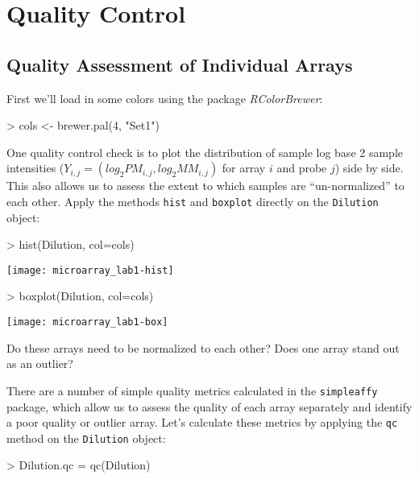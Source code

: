 \documentclass[12pt]{article}
\newcommand{\code}[1]{{\texttt{#1}}}
\begin{document}
\section{Quality Control}

\subsection{Quality Assessment of Individual Arrays}
 
First we'll load in some colors using the package {\it RColorBrewer}:
  
\begin{Schunk}
\begin{Sinput}
> cols <- brewer.pal(4, "Set1")
\end{Sinput}
\end{Schunk}
 
One quality control check is to plot the distribution of sample log base 2 sample intensities ($Y_{i,j} = (log_2PM_{i,j},log_2MM_{i,j})$ for array $i$ and probe $j$) side by side.  This also allows us to assess the extent to which samples are ``un-normalized'' to each other.  Apply the methods \code{hist} and \code{boxplot} directly on the \code{Dilution} object:
 
\begin{Schunk}
\begin{Sinput}
> hist(Dilution, col=cols)
\end{Sinput}
\end{Schunk}
\texttt{[image: microarray\_lab1-hist]}
 
\begin{Schunk}
\begin{Sinput}
> boxplot(Dilution, col=cols)
\end{Sinput}
\end{Schunk}
\texttt{[image: microarray\_lab1-box]}
 
Do these arrays need to be normalized to each other?  Does one array stand out as an outlier?

There are a number of simple quality metrics calculated in the \code{simpleaffy} package, which allow us to assess the quality of each array separately and identify a poor quality or outlier array.  Let's calculate these metrics by applying the \code{qc} method on the \code{Dilution} object:       

\begin{Schunk}
\begin{Sinput}
> Dilution.qc = qc(Dilution)
\end{Sinput}
\end{Schunk}
\end{document}
